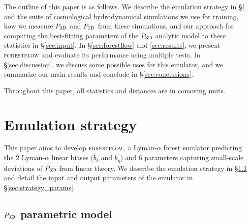 \documentclass{aa}
\newcommand{\lya}{Lyman-$\alpha$\xspace}
\newcommand{\lyaf}{Lyman-$\alpha$ forest\xspace}
\newcommand{\poned}{\ensuremath{P_{\rm 1D}}\xspace}
\newcommand{\pthreed}{\ensuremath{P_{\rm 3D}}\xspace}
\newcommand{\forestflow}{\textsc{forestflow}\xspace}
\begin{document}
The outline of this paper is as follows. We describe the emulation strategy in \S\ref{sec:strategy} and the suite of cosmological hydrodynamical simulations we use for training, how we measure \pthreed and \poned from these simulations, and our approach for computing the best-fitting parameters of the \pthreed analytic model to these statistics in \S\ref{sec:input}. In \S\ref{sec:forestflow} and \ref{sec:results}, we present \forestflow and evaluate its performance using multiple tests. In \S\ref{sec:discussion}, we discuss some possible uses for this emulator, and we summarize our main results and conclude in \S\ref{sec:conclusions}.

Throughout this paper, all statistics and distances are in comoving units.


\section{Emulation strategy}
\label{sec:strategy}

This paper aims to develop \forestflow, a \lyaf emulator predicting the 2 \lya linear biases ($b_\delta$ and $b_\eta$) and 6 parameters capturing small-scale deviations of \pthreed from linear theory. We describe the emulation strategy in \S\ref{sec:strategy_model} and detail the input and output parameters of the emulator in \S\ref{sec:strategy_params}.


\subsection{\pthreed parametric model}
\label{sec:strategy_model}
\end{document}

